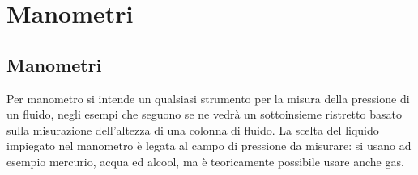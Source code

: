 %
\section{Manometri}
\subsection{Manometri}
Per manometro si intende un qualsiasi strumento per la misura della pressione di un fluido, negli esempi che seguono se ne vedrà un sottoinsieme ristretto basato sulla misurazione dell'altezza di una colonna di fluido.
La scelta del liquido impiegato nel manometro è legata al campo di pressione da misurare: si usano ad esempio mercurio, acqua ed alcool, ma è teoricamente possibile usare anche gas.

